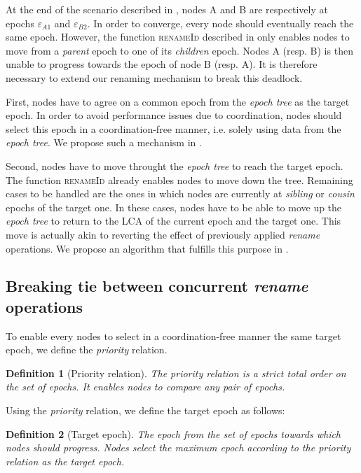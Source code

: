 \documentclass[10pt,journal,compsoc]{IEEEtran}
\newtheorem{definition}{Definition}
\newcommand{\ie}{i.e. }
\newcommand{\epoch}[1]{$\varepsilon_{#1}$}
\begin{document}
At the end of the scenario described in , nodes A and B are respectively at epochs \epoch{A1} and \epoch{B2}.
In order to converge, every node should eventually reach the same epoch.
However, the function \textsc{renameId} described in  only enables nodes to move from a \emph{parent} epoch to one of its \emph{children} epoch.
Nodes A (resp. B) is then unable to progress towards the epoch of node B (resp. A).
It is therefore necessary to extend our renaming mechanism to break this deadlock.

First, nodes have to agree on a common epoch from the \emph{epoch tree} as the target epoch.
In order to avoid performance issues due to coordination, nodes should select this epoch in a coordination-free manner, \ie solely using data from the \emph{epoch tree}.
We propose such a mechanism in .

Second, nodes have to move throught the \emph{epoch tree} to reach the target epoch.
The function \textsc{renameId} already enables nodes to move down the tree.
Remaining cases to be handled are the ones in which nodes are currently at \emph{sibling} or \emph{cousin} epochs of the target one.
In these cases, nodes have to be able to move up the \emph{epoch tree} to return to the \ac{LCA} of the current epoch and the target one.
This move is actually akin to reverting the effect of previously applied \emph{rename} operations.
We propose an algorithm that fulfills this purpose in .

\subsection{Breaking tie between concurrent \emph{rename} operations}
\label{sec:priority}

To enable every nodes to select in a coordination-free manner the same target epoch, we define the \emph{priority} relation.

\begin{definition}[Priority relation]
    The \emph{priority} relation is a strict total order on the set of epochs.
    It enables nodes to compare any pair of epochs.
\end{definition}

Using the \emph{priority} relation, we define the target epoch as follows:

\begin{definition}[Target epoch]
    The epoch from the set of epochs towards which nodes should progress.
    Nodes select the maximum epoch according to the \emph{priority} relation as the target epoch.
\end{definition}
\end{document}
